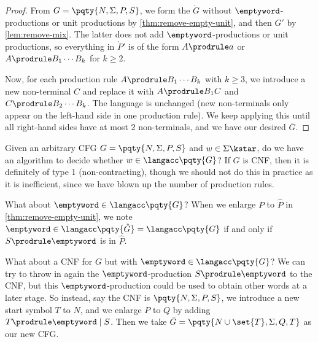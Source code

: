 \begin{proof}
    From \(G = \pqty{N, \Sigma, P, S}\), we form the \(\mathring{G}\) without \(\emptyword\)-productions or unit productions by \autoref{thm:remove-empty-unit}, and then \(G'\) by \autoref{lem:remove-mix}. The latter does not add \(\emptyword\)-productions or unit productions, so everything in \(\mathring{P}'\) is of the form \(A \prodrule a\) or \(A \prodrule B_1 \cdots B_k\) for \(k \geq 2\).

    Now, for each production rule \(A \prodrule B_1 \cdots B_k\) with \(k \geq 3\), we introduce a new non-terminal \(C\) and replace it with \(A \prodrule B_1 C\) and \(C \prodrule B_2 \cdots B_k\). The language is unchanged (new non-terminals only appear on the left-hand side in one production rule). We keep applying this until all right-hand sides have at most 2 non-terminals, and we have our desired \(\bar{G}\).
\end{proof}

Given an arbitrary CFG \(G = \pqty{N, \Sigma, P, S}\) and \(w \in \Sigma\kstar\), do we have an algorithm to decide whether \(w \in \langacc\pqty{G}\)? If \(G\) is CNF, then it is definitely of type 1 (non-contracting), though we should not do this in practice as it is inefficient, since we have blown up the number of production rules.

What about \(\emptyword \in \langacc\pqty{G}\)? When we enlarge \(P\) to \(\hat{P}\) in \autoref{thm:remove-empty-unit}, we note \(\emptyword \in \langacc\pqty{\hat{G}} = \langacc\pqty{G}\) if and only if \(S \prodrule \emptyword\) is in \(\hat{P}\).

What about a CNF for \(G\) but with \(\emptyword \in \langacc\pqty{G}\)? We can try to throw in again the \(\emptyword\)-production \(S \prodrule \emptyword\) to the CNF, but this \(\emptyword\)-production could be used to obtain other words at a later stage. So instead, say the CNF is \(\pqty{N, \Sigma, P, S}\), we introduce a new start symbol \(T\) to \(N\), and we enlarge \(P\) to \(Q\) by adding \(T \prodrule \emptyword \mid S\). Then we take \(\bar{G} = \pqty{N \cup \set{T}, \Sigma, Q, T}\) as our new CFG.

